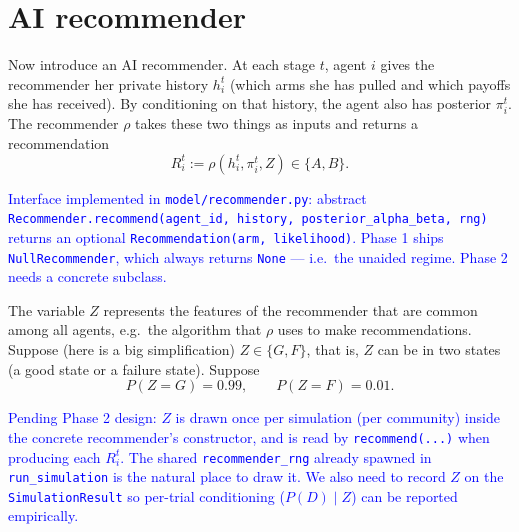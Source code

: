 \documentclass[12pt]{article}
\newcommand{\ignacio}[1]{\textcolor{blue}{#1}}
\begin{document}
\section{AI recommender}
\label{sec:airec}

Now introduce an AI recommender.
At each stage $t$, agent $i$ gives the recommender her private history $h_i^t$ (which arms she has pulled and which payoffs she has received).
By conditioning on that history, the agent also has posterior $\pi_i^t$.
The recommender $\rho$ takes these two things as inputs and returns a recommendation
\[
  R_i^t := \rho(h_i^t, \pi_i^t, Z) \in \{A, B\}.
\]

\ignacio{Interface implemented in \texttt{model/recommender.py}: abstract \texttt{Recommender.recommend(agent\_id, history, posterior\_alpha\_beta, rng)} returns an optional \texttt{Recommendation(arm, likelihood)}. Phase 1 ships \texttt{NullRecommender}, which always returns \texttt{None} --- i.e.\ the unaided regime. Phase 2 needs a concrete subclass.}

The variable $Z$ represents the features of the recommender that are common among all agents, e.g.\ the algorithm that $\rho$ uses to make recommendations.
Suppose (here is a big simplification) $Z \in \{G, F\}$, that is, $Z$ can be in two states (a good state or a failure state).
Suppose
\[
  P(Z = G) = 0.99, \qquad P(Z = F) = 0.01.
\]

\ignacio{Pending Phase 2 design: $Z$ is drawn once per simulation (per community) inside the concrete recommender's constructor, and is read by \texttt{recommend(...)} when producing each $R_i^t$. The shared \texttt{recommender\_rng} already spawned in \texttt{run\_simulation} is the natural place to draw it. We also need to record $Z$ on the \texttt{SimulationResult} so per-trial conditioning ($P(D) \mid Z$) can be reported empirically.}
\end{document}
